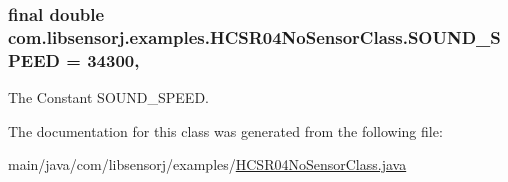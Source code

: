 \subsubsection[{S\+O\+U\+N\+D\+\_\+\+S\+P\+E\+E\+D}]{\setlength{\rightskip}{0pt plus 5cm}final double com.\+libsensorj.\+examples.\+H\+C\+S\+R04\+No\+Sensor\+Class.\+S\+O\+U\+N\+D\+\_\+\+S\+P\+E\+E\+D = 34300\hspace{0.3cm}{\ttfamily [static]}, {\ttfamily [private]}}\label{classcom_1_1libsensorj_1_1examples_1_1HCSR04NoSensorClass_aae05bb29da08230984f93f167de14ee6}
The Constant S\+O\+U\+N\+D\+\_\+\+S\+P\+E\+E\+D. 

The documentation for this class was generated from the following file\+:\begin{DoxyCompactItemize}
\item 
main/java/com/libsensorj/examples/\hyperlink{HCSR04NoSensorClass_8java}{H\+C\+S\+R04\+No\+Sensor\+Class.\+java}\end{DoxyCompactItemize}
